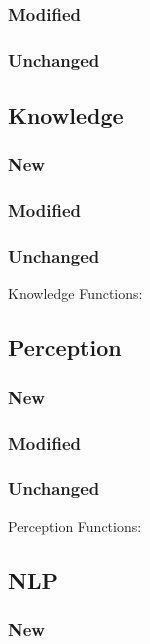 \documentclass[main.tex]{subfiles}
\begin{document}
                \subsubsection{Modified}
                \subsubsection{Unchanged}
                
                \subsection{Knowledge}
                \subsubsection{New}
                \subsubsection{Modified}
                \subsubsection{Unchanged}Knowledge Functions:
                
                \subsection{Perception}
                \subsubsection{New}
                \subsubsection{Modified}
                \subsubsection{Unchanged}Perception Functions:
                
                \subsection{NLP}
                \subsubsection{New}
\end{document}
